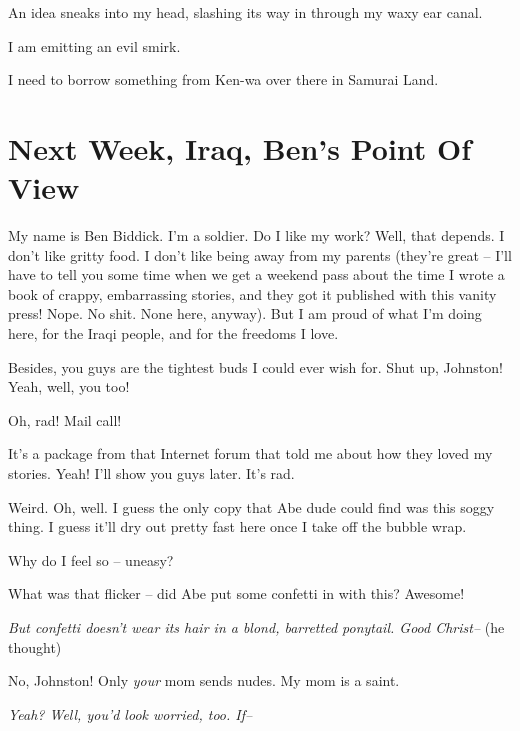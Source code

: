 An idea sneaks into my head, slashing its way in through my waxy
ear canal.



I am emitting an evil smirk.



I need to borrow something from Ken-wa over there in Samurai
Land.



\section*{Next Week, Iraq, Ben's Point Of View}



My name is Ben Biddick. I'm a soldier. Do I like my work? Well,
that depends. I don't like gritty food. I don't like being away
from my parents (they're great -- I'll have to tell you some time
when we get a weekend pass about the time I wrote a book of crappy,
embarrassing stories, and they got it published with this vanity
press! Nope. No shit. None here, anyway). But I am proud of what
I'm doing here, for the Iraqi people, and for the freedoms I
love.



Besides, you guys are the tightest buds I could ever wish for. Shut
up, Johnston! Yeah, well, you too!



Oh, rad! Mail call!



It's a package from that Internet forum that told me about how they
loved my stories. Yeah! I'll show you guys later. It's rad.



Weird. Oh, well. I guess the only copy that Abe dude could find was
this soggy thing. I guess it'll dry out pretty fast here once I
take off the bubble wrap.



Why do I feel so -- uneasy?



What was that flicker -- did Abe put some confetti in with this?
Awesome!



{\em But confetti doesn't wear its hair in a blond, barretted
ponytail. Good Christ--} (he thought)



No, Johnston! Only {\em your} mom sends nudes. My mom is a
saint.



{\em Yeah? Well, you'd look worried, too. If--}



